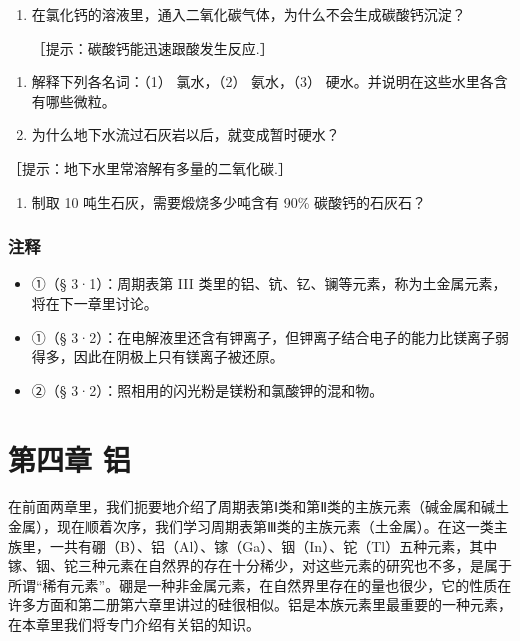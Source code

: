 \begin{enumerate}[start=5,label={*\arabic*.}]
\item
  在氯化钙的溶液里，通入二氧化碳气体，为什么不会生成碳酸钙沉淀？

［提示：碳酸钙能迅速跟酸发生反应.］

\end{enumerate}
\begin{enumerate}[start=6]
\item
  解释下列各名词：（1） 氯水，（2） 氨水，（3）
  硬水。并说明在这些水里各含有哪些微粒。
\item
  为什么地下水流过石灰岩以后，就变成暂时硬水？
\end{enumerate}

［提示：地下水里常溶解有多量的二氧化碳.］

\begin{enumerate}[start=8]
\item
  制取 10 吨生石灰，需要煅烧多少吨含有 90\% 碳酸钙的石灰石？
\end{enumerate}

\subsection{注释}

\begin{itemize}
\item
  ①（§ 3·1）：周期表第 III
  类里的铝、钪、钇、镧等元素，称为土金属元素，将在下一章里讨论。
\item
  ①（§
  3·2）：在电解液里还含有钾离子，但钾离子结合电子的能力比镁离子弱得多，因此在阴极上只有镁离子被还原。
\item
  ②（§ 3·2）：照相用的闪光粉是镁粉和氯酸钾的混和物。
\end{itemize}

\chapter{第四章 铝}

在前面两章里，我们扼要地介绍了周期表第Ⅰ类和第Ⅱ类的主族元素（碱金属和碱土金属），现在顺着次序，我们学习周期表第Ⅲ类的主族元素（土金属）。在这一类主族里，一共有硼（B）、铝（Al）、镓（Ga）、铟（In）、铊（Tl）五种元素，其中镓、铟、铊三种元素在自然界的存在十分稀少，对这些元素的研究也不多，是属于所谓``稀有元素''。硼是一种非金属元素，在自然界里存在的量也很少，它的性质在许多方面和第二册第六章里讲过的硅很相似。铝是本族元素里最重要的一种元素，在本章里我们将专门介绍有关铝的知识。

